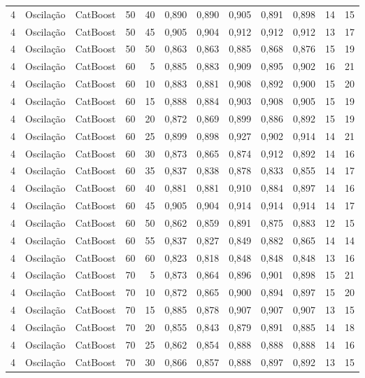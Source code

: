 \begin{longtable}{@{}rllrrrrrrrrr@{}}
4 & Oscilação & CatBoost & 50 & 40 & 0,890 & 0,890 & 0,905 & 0,891 & 0,898 & 14 & 15 \\
4 & Oscilação & CatBoost & 50 & 45 & 0,905 & 0,904 & 0,912 & 0,912 & 0,912 & 13 & 17 \\
4 & Oscilação & CatBoost & 50 & 50 & 0,863 & 0,863 & 0,885 & 0,868 & 0,876 & 15 & 19 \\
4 & Oscilação & CatBoost & 60 & 5 & 0,885 & 0,883 & 0,909 & 0,895 & 0,902 & 16 & 21 \\
4 & Oscilação & CatBoost & 60 & 10 & 0,883 & 0,881 & 0,908 & 0,892 & 0,900 & 15 & 20 \\
4 & Oscilação & CatBoost & 60 & 15 & 0,888 & 0,884 & 0,903 & 0,908 & 0,905 & 15 & 19 \\
4 & Oscilação & CatBoost & 60 & 20 & 0,872 & 0,869 & 0,899 & 0,886 & 0,892 & 15 & 19 \\
4 & Oscilação & CatBoost & 60 & 25 & 0,899 & 0,898 & 0,927 & 0,902 & 0,914 & 14 & 21 \\
4 & Oscilação & CatBoost & 60 & 30 & 0,873 & 0,865 & 0,874 & 0,912 & 0,892 & 14 & 16 \\
4 & Oscilação & CatBoost & 60 & 35 & 0,837 & 0,838 & 0,878 & 0,833 & 0,855 & 14 & 17 \\
4 & Oscilação & CatBoost & 60 & 40 & 0,881 & 0,881 & 0,910 & 0,884 & 0,897 & 14 & 16 \\
4 & Oscilação & CatBoost & 60 & 45 & 0,905 & 0,904 & 0,914 & 0,914 & 0,914 & 14 & 17 \\
4 & Oscilação & CatBoost & 60 & 50 & 0,862 & 0,859 & 0,891 & 0,875 & 0,883 & 12 & 15 \\
4 & Oscilação & CatBoost & 60 & 55 & 0,837 & 0,827 & 0,849 & 0,882 & 0,865 & 14 & 14 \\
4 & Oscilação & CatBoost & 60 & 60 & 0,823 & 0,818 & 0,848 & 0,848 & 0,848 & 13 & 16 \\
4 & Oscilação & CatBoost & 70 & 5 & 0,873 & 0,864 & 0,896 & 0,901 & 0,898 & 15 & 21 \\
4 & Oscilação & CatBoost & 70 & 10 & 0,872 & 0,865 & 0,900 & 0,894 & 0,897 & 15 & 20 \\
4 & Oscilação & CatBoost & 70 & 15 & 0,885 & 0,878 & 0,907 & 0,907 & 0,907 & 13 & 15 \\
4 & Oscilação & CatBoost & 70 & 20 & 0,855 & 0,843 & 0,879 & 0,891 & 0,885 & 14 & 18 \\
4 & Oscilação & CatBoost & 70 & 25 & 0,862 & 0,854 & 0,888 & 0,888 & 0,888 & 14 & 16 \\
4 & Oscilação & CatBoost & 70 & 30 & 0,866 & 0,857 & 0,888 & 0,897 & 0,892 & 13 & 15 \\

\end{longtable}
